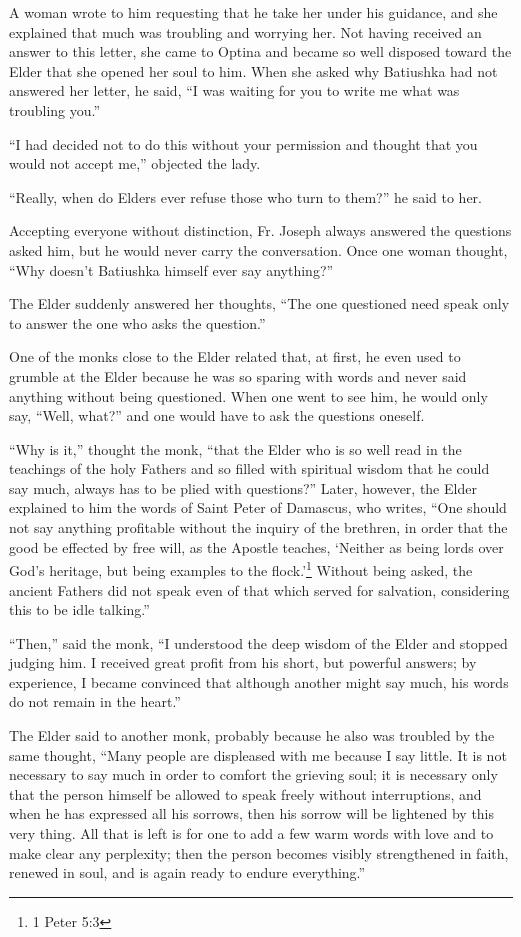 A woman wrote to him requesting that he take her under his guidance, and she explained that much was troubling and worrying her. Not having received an answer to this letter, she came to Optina and became so well disposed toward the Elder that she opened her soul to him. When she asked why Batiushka had not answered her letter, he said, ``I was waiting for you to write me what was troubling you.''

``I had decided not to do this without your permission and thought that you would not accept me,'' objected the lady.

``Really, when do Elders ever refuse those who turn to them?'' he said to her.

Accepting everyone without distinction, Fr. Joseph always answered the questions asked him, but he would never carry the conversation. Once one woman thought, ``Why doesn't Batiushka himself ever say anything?''

The Elder suddenly answered her thoughts, ``The one questioned need speak only to answer the one who asks the question.''

One of the monks close to the Elder related that, at first, he even used to grumble at the Elder because he was so sparing with words and never said anything without being questioned. When one went to see him, he would only say, ``Well, what?'' and one would have to ask the questions oneself.

``Why is it,'' thought the monk, ``that the Elder who is so well read in the teachings of the holy Fathers and so filled with spiritual wisdom that he could say much, always has to be plied with questions?'' Later, however, the Elder explained to him the words of Saint Peter of Damascus, who writes, ``One should not say anything profitable without the inquiry of the brethren, in order that the good be effected by free will, as the Apostle teaches, `Neither as being lords over God's heritage, but being examples to the flock.'\footnote{1 Peter 5:3} Without being asked, the ancient Fathers did not speak even of that which served for salvation, considering this to be idle talking.''

``Then,'' said the monk, ``I understood the deep wisdom of the Elder and stopped judging him. I received great profit from his short, but powerful answers; by experience, I became convinced that although another might say much, his words do not remain in the heart.''

The Elder said to another monk, probably because he also was troubled by the same thought, ``Many people are displeased with me because I say little. It is not necessary to say much in order to comfort the grieving soul; it is necessary only that the person himself be allowed to speak freely without interruptions, and when he has expressed all his sorrows, then his sorrow will be lightened by this very thing. All that is left is for one to add a few warm words with love and to make clear any perplexity; then the person becomes visibly strengthened in faith, renewed in soul, and is again ready to endure everything.''

